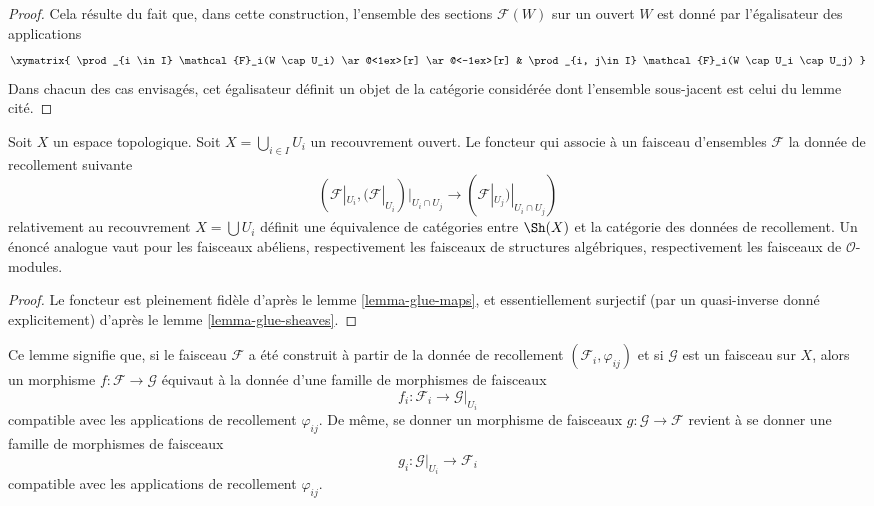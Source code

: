 \begin{proof}
Cela résulte du fait que, dans cette construction, l'ensemble des sections
$\mathcal{F}(W)$ sur un ouvert $W$ est donné par l'égalisateur des
applications
$$
\xymatrix{
\prod_{i \in I} \mathcal{F}_i(W \cap U_i)
\ar@<1ex>[r]
\ar@<-1ex>[r]
&
\prod_{i, j\in I} \mathcal{F}_i(W \cap U_i \cap U_j)
}
$$
Dans chacun des cas envisagés, cet égalisateur définit un objet de la
catégorie considérée dont l'ensemble sous-jacent est celui du lemme cité.
\end{proof}

\begin{lemma}
\label{lemma-mapping-property-glue}
Soit $X$ un espace topologique.
Soit $X = \bigcup_{i\in I} U_i$ un recouvrement ouvert.
Le foncteur qui associe à un faisceau d'ensembles $\mathcal{F}$
la donnée de recollement suivante
$$
(\mathcal{F}|_{U_i},
(\mathcal{F}|_{U_i})|_{U_i \cap U_j}
\to
(\mathcal{F}|_{U_j})|_{U_i \cap U_j}
)
$$
relativement au recouvrement $X = \bigcup U_i$ définit une équivalence
de catégories entre $\Sh(X)$ et la catégorie des données de recollement.
Un énoncé analogue vaut pour les faisceaux abéliens, respectivement
les faisceaux de structures algébriques, respectivement les faisceaux
de $\mathcal{O}$-modules.
\end{lemma}

\begin{proof}
Le foncteur est pleinement fidèle d'après le
lemme \ref{lemma-glue-maps}, et essentiellement surjectif (par un
quasi-inverse donné explicitement) d'après le
lemme \ref{lemma-glue-sheaves}.
\end{proof}

\noindent
Ce lemme signifie que, si le faisceau $\mathcal{F}$ a été construit
à partir de la donnée de recollement $(\mathcal{F}_i, \varphi_{ij})$
et si $\mathcal{G}$ est un faisceau sur $X$, alors un morphisme
$f : \mathcal{F} \to \mathcal{G}$ équivaut à la donnée d'une famille
de morphismes de faisceaux
$$
f_i : \mathcal{F}_i \longrightarrow \mathcal{G}|_{U_i}
$$
compatible avec les applications de recollement $\varphi_{ij}$.
De même, se donner un morphisme de faisceaux
$g : \mathcal{G} \to \mathcal{F}$ revient à se donner une famille
de morphismes de faisceaux
$$
g_i : \mathcal{G}|_{U_i} \longrightarrow \mathcal{F}_i
$$
compatible avec les applications de recollement $\varphi_{ij}$.










